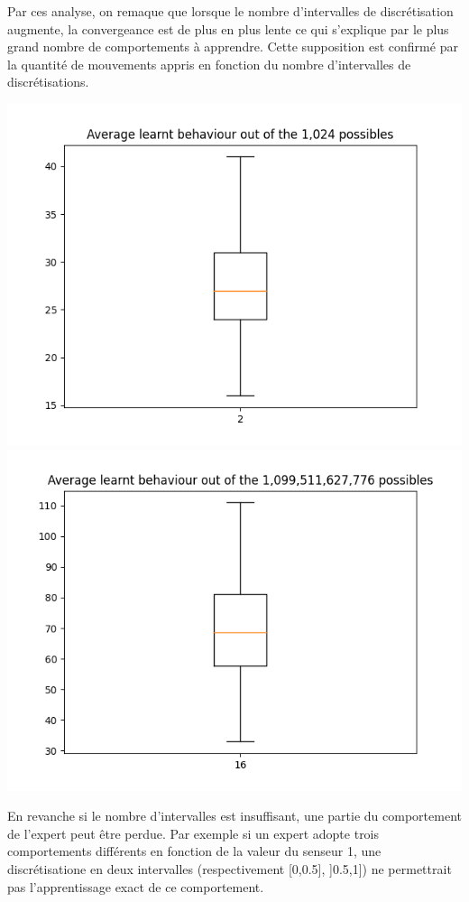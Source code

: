 \documentclass[a4paper, 12pt]{report}
\begin{document}
	Par ces analyse, on remaque que lorsque le nombre d'intervalles de discrétisation augmente, la convergeance est de plus en plus lente ce qui s'explique par le plus grand nombre de comportements à apprendre.
	 Cette supposition est confirmé par la quantité de mouvements appris en fonction du nombre d'intervalles de discrétisations.
	 
	 
\includegraphics[scale = 0.5]{averageLearntBehaviourD2}
\includegraphics[scale = 0.5]{averageLearntBehaviourD16}
	
	En revanche si le nombre d'intervalles est insuffisant, une partie du comportement de l'expert peut être perdue. Par exemple si un expert adopte trois comportements différents en fonction de la valeur du senseur 1, une discrétisatione en deux intervalles (respectivement [0,0.5], ]0.5,1]) ne permettrait pas l'apprentissage exact de ce comportement.
	
\end{document}
